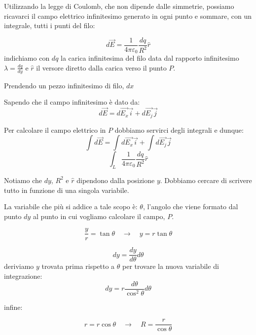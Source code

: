 Utilizzando la legge di Coulomb, che non dipende dalle simmetrie, possiamo ricavarci il campo elettrico infinitesimo generato in ogni punto e sommare, con un integrale, tutti i punti del filo:

\begin{equation*}
    d\vec{E}  = \frac{1}{4\pi \varepsilon_0}\frac{dq}{R^2}\hat{r}
\end{equation*}
indichiamo con $dq$ la carica infinitesima del filo data dal rapporto infinitesimo $\lambda = \frac{dq}{dy}$ e $\hat{r}$ il versore diretto dalla carica  verso il punto $P$.

Prendendo un pezzo infinitesimo di filo, $dx$

Sapendo che il campo infinitesimo è dato da:
\begin{equation*}
    d\vec{E} = d\vec{E_x}\vec{i} + d\vec{E_j}\vec{j}
\end{equation*}

Per calcolare il campo elettrico in $P$ dobbiamo servirci degli integrali e dunque:
\begin{equation*}
   \int d\vec{E} = \int d\vec{E_x}\vec{i} + \int d\vec{E_j}\vec{j}
\end{equation*}
\begin{equation*}
   \int_L \frac{1}{4\pi \varepsilon_0}\frac{dq}{R^2}\hat{r}
\end{equation*}

Notiamo che $dy$, $R^2$ e $\hat{r}$ dipendono dalla posizione $y$. Dobbiamo cercare di scrivere tutto in funzione di una singola variabile.

La variabile che più si addice a tale scopo è: $\theta$, l'angolo che viene formato dal punto $dy$ al punto in cui vogliamo calcolare il campo, $P$.

\begin{equation*}
    \frac{y}{r} = \tan\theta\quad\rightarrow\quad y = r\tan\theta
\end{equation*}

\begin{equation*}
     dy = \frac{dy}{d\theta}d\theta
\end{equation*}
deriviamo $y$ trovata prima rispetto a $\theta$ per trovare la nuova variabile di integrazione:
\begin{equation*}
     dy = r\frac{d\theta}{\cos^2\theta}d\theta
\end{equation*}

infine:

\begin{equation*}
    r = r\cos\theta\quad\rightarrow\quad R = \frac{r}{\cos\theta}
\end{equation*}


